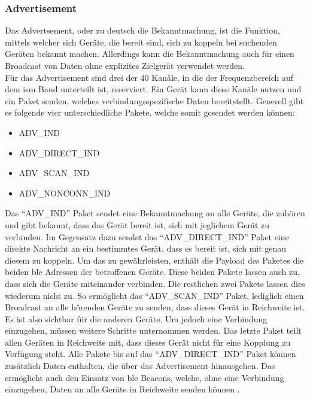\subsubsection{Advertisement}
\label{sss:funktionsweise:advertisement}

Das Advertsement, oder zu deutsch die Bekanntmachung, ist die Funktion, mittels welcher sich Geräte, die bereit sind, sich zu koppeln bei suchenden Geräten bekannt machen. Allerdings kann die Bekanntmachung auch für einen Broadcast von Daten ohne explizites Zielgerät verwendet werden.\\

\noindent Für das Advertisement sind drei der 40 Kanäle, in die der Frequenzbereich auf dem \ac{ism} Band unterteilt ist, reserviert. Ein Gerät kann diese Kanäle nutzen und ein Paket senden, welches verbindungsspezifische Daten bereitstellt. Generell gibt es folgende vier unterschiedliche Pakete, welche somit gesendet werden können:
\begin{itemize}
	\item{ADV\_IND}
	\item{ADV\_DIRECT\_IND}
	\item{ADV\_SCAN\_IND}
	\item{ADV\_NONCONN\_IND}
\end{itemize} 
Das "`ADV\_IND"' Paket sendet eine Bekanntmachung an alle Geräte, die zuhören und gibt bekannt, dass das Gerät bereit ist, sich mit jeglichem Gerät zu verbinden. Im Gegensatz dazu sendet das "`ADV\_DIRECT\_IND"' Paket eine direkte Nachricht an ein bestimmtes Gerät, dass es bereit ist, sich mit genau diesem zu koppeln. Um das zu gewährleisten, enthält die Payload des Paketes die beiden \ac{ble} Adressen der betroffenen Geräte. Diese beiden Pakete lassen auch zu, dass sich die Geräte miteinander verbinden. Die restlichen zwei Pakete lassen dies wiederum nicht zu. So ermöglicht das "`ADV\_SCAN\_IND"' Paket, lediglich einen Broadcast an alle hörenden Geräte zu senden, dass dieses Gerät in Reichweite ist. Es ist also sichtbar für die anderen Geräte. Um jedoch eine Verbindung einzugehen, müssen weitere Schritte unternommen werden. Das letzte Paket teilt allen Geräten in Reichweite mit, dass dieses Gerät nicht für eine Kopplung zu Verfügung steht. Alle Pakete bis auf das "`ADV\_DIRECT\_IND"' Paket können zusätzlich Daten enthalten, die über das Advertisement hinausgehen. Das ermöglicht auch den Einsatz von \ac{ble} Beacons, welche, ohne eine Verbindung einzugehen, Daten an alle Geräte in Reichweite senden können \cite{ADV:WWW}.\\

